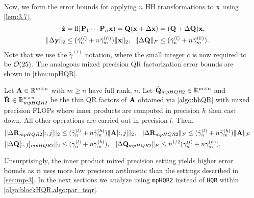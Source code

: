 Now, we form the error bounds for applying $n$ HH transformations to $\mathbf{x}$ using \cref{lem:3.7},
\begin{align}
\hat{\bb{z}} &= \fl(\bb{P}_1\cdots\bb{P}_n\bb{x})=\bb{Q} (\bb{x} +\Delta \bb{x}) = (\bb{Q} + \Delta \bb{Q})\bb{x},\\
\|\Delta \bb{y}\|_2 &\leq (\tilde{\gamma}_n^{(l)}+n\tilde{\gamma}_m^{(h)})\|\bb{x}\|_2,\;\; \|\Delta \bb{Q}\|_F\leq (\tilde{\gamma}_n^{(l)}+n\tilde{\gamma}_m^{(h)}).\label{eqn:mp19.3}
\end{align} 
Note that we use the $\tilde{\gamma}^{(l)}$ notation, where the small integer $c$ is now required to be $\mathcal{O}(25)$.
The analogous mixed precision QR factorization error bounds are shown in \cref{thm:mpHQR}.
\begin{theorem}
	\label{thm:mpHQR}
	Let $\mathbf{A}\in\mathbb{R}^{m\times n}$ with $m\geq n$ have full rank, $n$. 
	Let $\hat{\mathbf{Q}}_{mpHQR2}\in\mathbb{R}^{m\times n}$ and $\hat{\mathbf{R}}\in\mathbb{R}^{n\times n}_{mpHQR2}$ be the thin QR factors of $\mathbf{A}$ obtained via \cref{algo:hhQR} with mixed precision FLOPs where inner products are computed in precision $h$ then cast down.
	All other operations are carried out in precision $l$.
	Then,
	\begin{align*}
	\|\Delta \mathbf{R}_{mpHQR2}[:,j]\|_2&\leq (\tilde{\gamma}_n^{(l)}+n\tilde{\gamma}_m^{(h)}) \|\mathbf{A}[:,j]\|_2,\;\; \|\Delta \mathbf{R}_{mpHQR2}\|_F\leq (\tilde{\gamma}_n^{(l)}+n\tilde{\gamma}_m^{(h)}) \|\mathbf{A}\|_F\\
	\|\Delta \mathbf{Q}[:,j]_{mpHQR2}\|_2&\leq (\tilde{\gamma}_n^{(l)}+n\tilde{\gamma}_m^{(h)}),\;\; \|\Delta \mathbf{Q}_{mpHQR2}\|_F \leq n^{1/2} (\tilde{\gamma}_n^{(l)}+n\tilde{\gamma}_m^{(h)}).
	\end{align*}
\end{theorem}
Unsurprisingly, the inner product mixed precision setting yields higher error bounds as it uses more low precision arithmetic than the settings described in \cref{sec:mp-3}. 
In the next sections we analyze using {\tt mpHQR2} instead of {\tt HQR} within \cref{algo:blockHQR,algo:par_tsqr}.

